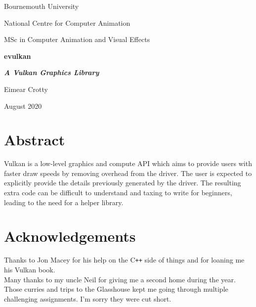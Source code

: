 \documentclass[12pt]{report}
\newcommand{\cpp}{C\texttt{++}}
\theoremstyle{definition}
\begin{document}
  \renewcommand{\familydefault}{\sfdefault}
  \selectfont

  \begin{titlepage}
    \centering
    {\Huge Bournemouth University\par}
    \vspace{0.5cm}
    {\Large National Centre for Computer Animation\par}
    \vspace{0.5cm}
    {\Large MSc in Computer Animation and Visual Effects\par}
    \vspace{5cm}
    {\huge \bfseries evulkan\par}
    \vspace{0.5cm}
    {\Large \bfseries \textit{A Vulkan Graphics Library}\par}
    \vspace{2cm}
    {\Large Eimear Crotty\par}
    \vfill
    {\Large August 2020}
  \end{titlepage}

  \chapter*{Abstract}
    Vulkan is a low-level graphics and compute API which aims to provide users with faster
    draw speeds by removing overhead from the driver. The user is expected to
    explicitly provide the details previously generated by the driver. The
    resulting extra code can be difficult to understand and taxing to write
    for beginners, leading to the need for a helper library.

  \chapter*{Acknowledgements}

    \vspace{1cm}
    Thanks to Jon Macey for his help on the \cpp{} side of things and for loaning
    me his Vulkan book.\\
    
    Many thanks to my uncle Neil for giving me a second home during the year. Those curries
    and trips to the Glasshouse kept me going through multiple challenging assignments.
    I'm sorry they were cut short. \\
\end{document}
